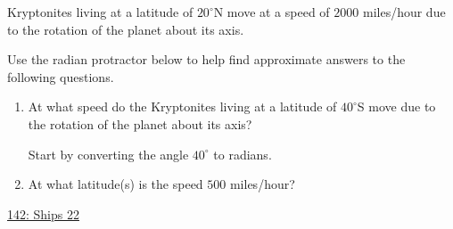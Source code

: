 \documentclass{ximera}
\begin{document}
\begin{question} \label{Q6721:Angles}
Kryptonites living at a latitude of $20^\circ$N move at a speed of $2000$ miles/hour due to the rotation of the planet about its axis.

Use the radian protractor below to help find approximate answers to the following questions.

\begin{enumerate}
\item  At what speed do the Kryptonites living at a latitude of $40^\circ$S move due to the rotation of the planet about its axis?
\begin{hint}
Start by converting the angle $40^\circ$ to radians.
\end{hint}

\item At what latitude(s) is the speed $500$ miles/hour?
\end{enumerate}


\begin{onlineOnly}
    \begin{center}
\end{center}
\end{onlineOnly}

\href{https://www.desmos.com/calculator/fmjbqszyge}{142: Ships 22}
\end{question}
\end{document}

